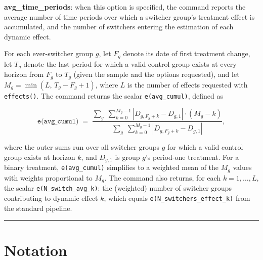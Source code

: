 \documentclass[11pt]{article}
\begin{document}
\noindent\textbf{avg\_time\_periods}: when this option is specified, the command
reports the average number of time periods over which a switcher group's
treatment effect is accumulated, and the number of switchers entering the
estimation of each dynamic effect.

For each ever-switcher group $g$, let $F_g$ denote its date of first treatment
change, let $T_g$ denote the last period for which a valid control group exists
at every horizon from $F_g$ to $T_g$ (given the sample and the options
requested), and let $M_g = \min(L,\, T_g - F_g + 1)$, where $L$ is the number
of effects requested with \texttt{effects()}. The command returns the scalar
\texttt{e(avg\_cumul)}, defined as

\[
  \texttt{e(avg\_cumul)}
  \;=\;
  \frac{\displaystyle\sum_{g}\;\sum_{k=0}^{M_g-1}
        |D_{g,F_g+k} - D_{g,1}|\cdot(M_g - k)}
       {\displaystyle\sum_{g}\;\sum_{k=0}^{M_g-1}
        |D_{g,F_g+k} - D_{g,1}|},
\]

where the outer sums run over all switcher groups $g$ for which a valid control
group exists at horizon $k$, and $D_{g,1}$ is group $g$'s period-one
treatment. For a binary treatment, \texttt{e(avg\_cumul)} simplifies to a
weighted mean of the $M_g$ values with weights proportional to $M_g$. The
command also returns, for each $k = 1,\dots,L$, the scalar
\texttt{e(N\_switch\_avg\_k)}: the (weighted) number of switcher groups
contributing to dynamic effect $k$, which equals
\texttt{e(N\_switchers\_effect\_k)} from the standard pipeline.

\noindent\rule{\linewidth}{0.4pt}
\bigskip

\section{Notation}
\end{document}

